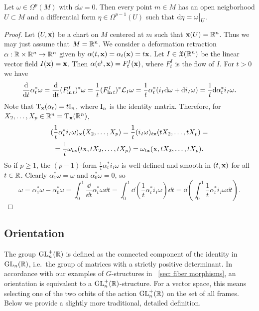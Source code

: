\begin{thm}\label{lem poincare classic}
    Let $\omega\in\Omega^p(M)$ with $\dd\omega=0$. Then every point $m\in M$ has an open neigborhood $U\subset M$ and a differential form $\eta\in\Omega^{p-1}(U)$ such that $\dd\eta=\restr{\omega}{U}$.
\end{thm}
\begin{proof}
    Let $(U,\bf{x})$ be a chart on $M$ centered at $m$ such that $\bf{x}(U)=\bbR^n$. Thus we may just assume that $M=\bbR^n$. We consider a deformation retraction $\alpha:\bbR\times\bbR^n\to \bbR^n$ given by $\alpha(t,\bf{x})=\alpha_t(\bf{x})=t\bf{x}$. Let $I\in \fX(\bbR^n)$ be the linear vector field $I(\bf{x})=\bf{x}$. Then $\alpha(\rme^t,\bf{x})=F^I_t(\bf{x})$, where $F^I_t$ is the flow of $I$. For $t>0$ we have 
    \[\frac{\dd}{\dd t}\alpha_t^\ast\omega=\frac{\dd}{\dd t}(F^I_{\ln t})^\ast\omega=\frac{1}{t}(F^I_{\ln t})^\ast \Lie_{I}\omega=\frac{1}{t}\alpha_t^\ast(i_{I}\dd\omega+\dd i_{I}\omega)=\frac{1}{t}\dd\alpha_t^\ast i_{I}\omega.\]
    Note that $\T_{\bf{x}}(\alpha_t)=t\rmI_n$, where $\rmI_n$ is the identity matrix. Therefore, for $X_2,\ldots,X_p\in \bbR^n=\T_{\bf{x}}(\bbR^n)$,
    \begin{multline}
        (\frac{1}{t}\alpha_t^\ast i_{I}\omega)_{\bf{x}}(X_2,\ldots,X_p)=\frac{1}{t}(i_I\omega)_{t\bf{x}}(tX_2,\ldots,tX_p)=\\
        =\frac{1}{t}\omega_{t\bf{x}}(t\bf{x},tX_2,\ldots,tX_p)=\omega_{t\bf{x}}(\bf{x},tX_2,\ldots,tX_p).
    \end{multline}
    So if $p\geq 1$, the $(p-1)$-form $\frac{1}{t}\alpha^\ast_t i_I\omega$ is well-defined and smooth in $(t,\bf{x})$ for all $t\in\bbR$. Clearly $\alpha^\ast_1\omega=\omega$ and $\alpha^\ast_0\omega=0$, so 
    \[\omega=\alpha_1^\ast\omega-\alpha^\ast_0\omega=\int_0^1\frac{\dd}{\dd t}\alpha_t^\ast\omega\dd t=\int_0^1\dd \left(\frac{1}{t}\alpha_t^\ast i_I\omega\right)\dd t=\dd \left(\int_0^1\frac{1}{t}\alpha_t^\ast i_I\omega\dd t\right).\]
\end{proof}




\subsection{Orientation}

The group $\GL^+_n(\bbR )$ is defined as the connected component of the identity in $\GL_n(\bbR )$, i.e.\ the group of matrices with a strictly positive determinant. In accordance with our examples of $G$-structures in \subsect~\ref{sec: fiber morphisms}, an orientation is equivalent to a $\GL_n^+(\bbR)$-structure. For a vector space, this means selecting one of the two orbits of the action $\GL_n^+(\bbR)$ on the set of all frames. Below we provide a slightly more traditional, detailed definition.


